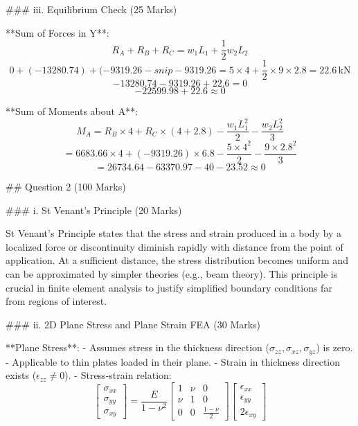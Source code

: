 ### iii. Equilibrium Check (25 Marks)

**Sum of Forces in Y**:
\[
R_A + R_B + R_C = w_1 L_1 + \frac{1}{2} w_2 L_2
\]
\[
0 + (-13280.74) + (-9319.26-snip-9319.26 = 5 \times 4 + \frac{1}{2} \times 9 \times 2.8 = 22.6 \, \text{kN}
\]
\[
-13280.74 - 9319.26 + 22.6 = 0
\]
\[
-22599.98 + 22.6 \approx 0
\]

**Sum of Moments about A**:
\[
M_A = R_B \times 4 + R_C \times (4 + 2.8) - \frac{w_1 L_1^2}{2} - \frac{w_2 L_2^2}{3}
\]
\[
= 6683.66 \times 4 + (-9319.26) \times 6.8 - \frac{5 \times 4^2}{2} - \frac{9 \times 2.8^2}{3}
\]
\[
= 26734.64 - 63370.97 - 40 - 23.52 \approx 0
\]

## Question 2 (100 Marks)

### i. St Venant’s Principle (20 Marks)

St Venant’s Principle states that the stress and strain produced in a body by a localized force or discontinuity diminish rapidly with distance from the point of application. At a sufficient distance, the stress distribution becomes uniform and can be approximated by simpler theories (e.g., beam theory). This principle is crucial in finite element analysis to justify simplified boundary conditions far from regions of interest.

### ii. 2D Plane Stress and Plane Strain FEA (30 Marks)

**Plane Stress**:
- Assumes stress in the thickness direction (\( \sigma_{zz}, \sigma_{xz}, \sigma_{yz} \)) is zero.
- Applicable to thin plates loaded in their plane.
- Strain in thickness direction exists (\( \epsilon_{zz} \neq 0 \)).
- Stress-strain relation:
\[
\begin{bmatrix} \sigma_{xx} \\ \sigma_{yy} \\ \sigma_{xy} \end{bmatrix} = \frac{E}{1 - \nu^2} \begin{bmatrix} 1 & \nu & 0 \\ \nu & 1 & 0 \\ 0 & 0 & \frac{1 - \nu}{2} \end{bmatrix} \begin{bmatrix} \epsilon_{xx} \\ \epsilon_{yy} \\ 2 \epsilon_{xy} \end{bmatrix}
\]

